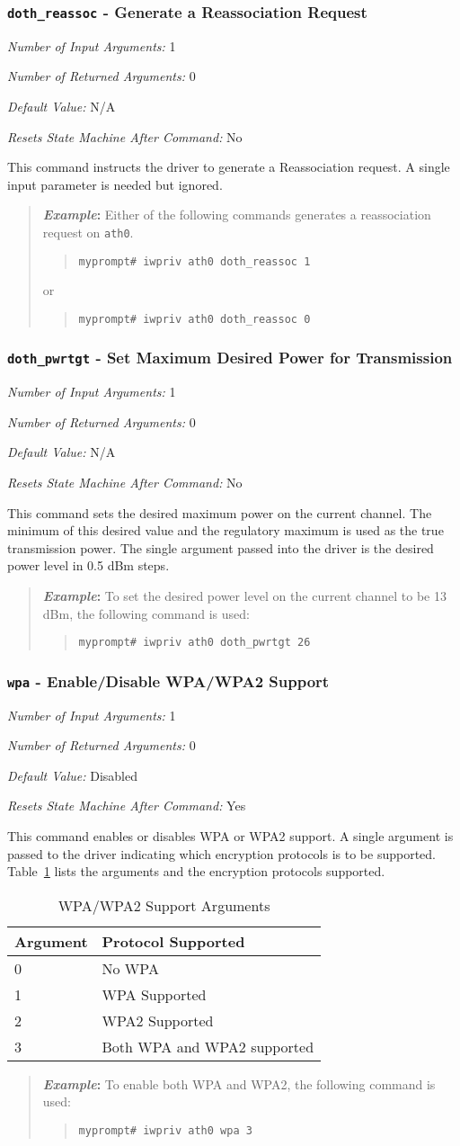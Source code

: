 \documentclass[10pt,fullpage]{article}
\newcommand{\mytt}[1]{{\texttt{#1}}}
\newcommand{\bv}{\begin{verse}}
\newcommand{\ev}{\end{verse}}
\newcommand{\cmd}[1]{{\texttt{myprompt\# #1}}}
\newcommand{\argdesc}[4]{\begin{description}
\itemsep -6pt
\item \textit{Number of Input Arguments:} #1
\item \textit{Number of Returned Arguments:} #2
\item \textit{Default Value:} #3
\item \textit{Resets State Machine After Command:} #4
\end{description}
}
\newenvironment{example}{\begin{quote}\textbf{\textit{Example}:}}{\end{quote}}
\begin{document}
\subsubsection{\mytt{doth\_reassoc} - Generate a Reassociation Request}
\argdesc{1}{0}{N/A}{No}
This command instructs the driver to generate a Reassociation request.
A single input parameter is needed but ignored.
\begin{example}
  Either of the following commands generates a reassociation request
  on \mytt{ath0}.
  \bv
  \cmd{iwpriv ath0 doth\_reassoc 1}
  \ev
  or
  \bv
  \cmd{iwpriv ath0 doth\_reassoc 0}
  \ev
\end{example}

\subsubsection{\mytt{doth\_pwrtgt} - Set Maximum Desired Power for
  Transmission}
\argdesc{1}{0}{N/A}{No}
This command sets the desired maximum power on the current channel.
The minimum of this desired value and the regulatory maximum is used
as the true transmission power.  The single argument passed into the
driver is the desired power level in 0.5 dBm steps.
\begin{example}
  To set the desired power level on the current channel to be 13 dBm,
  the following command is used:
  \bv
  \cmd{iwpriv ath0 doth\_pwrtgt 26}
  \ev
\end{example}

\subsubsection{\mytt{wpa} - Enable/Disable WPA/WPA2 Support}
\argdesc{1}{0}{Disabled}{Yes}
This command enables or disables WPA or WPA2 support.  A single
argument is passed to the driver indicating which encryption protocols
is to be supported.  Table~\ref{tab:wpa} lists the arguments and the
encryption protocols supported.
\begin{table}
  \centering
  \begin{tabular}{|l|l|} \hline
    Argument & Protocol Supported \\ \hline
    0 & No WPA \\
    1 & WPA Supported \\
    2 & WPA2 Supported \\
    3 & Both WPA and WPA2 supported \\ \hline
  \end{tabular}
  \caption{WPA/WPA2 Support Arguments}
  \label{tab:wpa}
\end{table}
\begin{example}
  To enable both WPA and WPA2, the following command is used:
  \bv
  \cmd{iwpriv ath0 wpa 3}
  \ev
\end{example}
\end{document}
